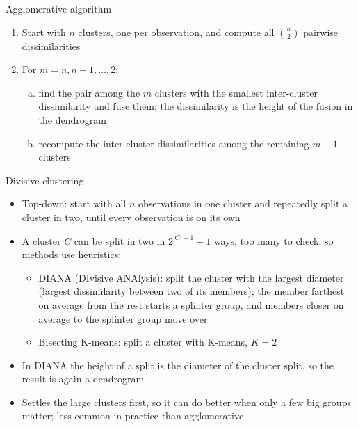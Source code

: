 \begin{frame}{Agglomerative algorithm}
    \begin{enumerate}
        \item Start with $n$ clusters, one per observation, and compute all $\binom{n}{2}$ pairwise dissimilarities
        \item For $m = n, n-1, \dots, 2$:
            \begin{enumerate}[(a)]
                \item find the pair among the $m$ clusters with the smallest inter-cluster dissimilarity and fuse them; the dissimilarity is the height of the fusion in the dendrogram
                \item recompute the inter-cluster dissimilarities among the remaining $m - 1$ clusters
            \end{enumerate}
    \end{enumerate}
\end{frame}

\begin{frame}{Divisive clustering}
    \begin{itemize}
        \item Top-down: start with all $n$ observations in one cluster and repeatedly split a cluster in two, until every observation is on its own
        \item A cluster $C$ can be split in two in $2^{|C|-1} - 1$ ways, too many to check, so methods use heuristics:
            \begin{itemize}
                \item DIANA (DIvisive ANAlysis): split the cluster with the largest diameter (largest dissimilarity between two of its members); the member farthest on average from the rest starts a splinter group, and members closer on average to the splinter group move over
                \item Bisecting K-means: split a cluster with K-means, $K = 2$
            \end{itemize}
        \item In DIANA the height of a split is the diameter of the cluster split, so the result is again a dendrogram
        \item Settles the large clusters first, so it can do better when only a few big groups matter; less common in practice than agglomerative
    \end{itemize}
\end{frame}

